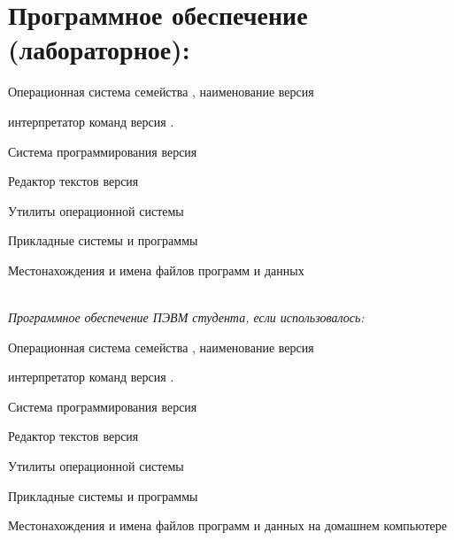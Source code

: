 \section{Программное обеспечение (лабораторное):}

Операционная система семейства \uline{\hspace{2cm}}, наименование \uline{\hspace{3cm}} версия \uline{\hfill}

интерпретатор команд \uline{\hspace{2cm}} версия \uline{\hspace{2cm}}.

Система программирования \uline{\hspace{6cm}} версия  \uline{\hfill}

Редактор текстов \uline{\hspace{6cm}} версия  \uline{\hfill}

Утилиты операционной системы \uline{\hfill}

\uline{\hfill}

Прикладные системы и программы \uline{\hfill}

Местонахождения и имена файлов программ и данных \uline{\hfill}

\uline{\hfill}\\

\textit{Программное обеспечение ПЭВМ студента, если использовалось:}

Операционная система семейства \uline{\hspace{2cm}}, наименование \uline{\hspace{3cm}} версия \uline{\hfill}

интерпретатор команд \uline{\hspace{2cm}} версия \uline{\hspace{2cm}}.

Система программирования \uline{\hspace{6cm}} версия  \uline{\hfill}

Редактор текстов \uline{\hspace{6cm}} версия  \uline{\hfill}

Утилиты операционной системы \uline{\hfill}

\uline{\hfill}

Прикладные системы и программы \uline{\hfill}

Местонахождения и имена файлов программ и данных на домашнем компьютере \uline{\hfill}

\uline{\hfill}

\newpage